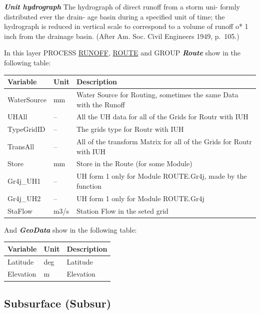 \documentclass[
]{book}
\begin{document}
\textbf{\emph{Unit hydrograph}} The hydrograph of direct runoff from a storm uni- formly distributed ever the drain- age basin during a specified unit of time; the hydrograph is reduced in vertical scale to correspond to a volume of runoff o* 1 inch from the drainage basin. (After Am. Soc. Civil Engineers 1949, p.~105.)

In this layer PROCESS \protect\hyperlink{RUNOFF}{RUNOFF}, \protect\hyperlink{ROUTE}{ROUTE} and GROUP \textbf{\emph{Route}} show in the following table:

\begin{table}[!h]
\centering
\begin{tabular}{l|l|l}
\hline
Variable & Unit & Description\\
\hline
WaterSource & mm & Water Source for Routing, sometimes the same Data with the Runoff\\
\cline{1-3}
UHAll & -- & All the UH data for all of the Grids for Routr with IUH\\
\cline{1-3}
TypeGridID & -- & The grids type for Routr with IUH\\
\cline{1-3}
TransAll & -- & All of the transform Matrix for all of the Grids for Routr with IUH\\
\cline{1-3}
Store & mm & Store in the Route (for some Module)\\
\cline{1-3}
Gr4j\_UH1 & -- & UH form 1 only for Module ROUTE.Gr4j, made by the function\\
\cline{1-3}
Gr4j\_UH2 & -- & UH form 1 only for Module ROUTE.Gr4j\\
\cline{1-3}
StaFlow & m3/s & Station Flow in the seted grid\\
\hline
\end{tabular}
\end{table}

And \textbf{\emph{GeoData}} show in the following table:

\begin{table}[!h]
\centering
\begin{tabular}{l|l|l}
\hline
Variable & Unit & Description\\
\hline
Latitude & deg & Latitude\\
\cline{1-3}
Elevation & m & Elevation\\
\hline
\end{tabular}
\end{table}

\hypertarget{Subsurface1}{%
\subsection{Subsurface (Subsur)}\label{Subsurface1}}
\end{document}
